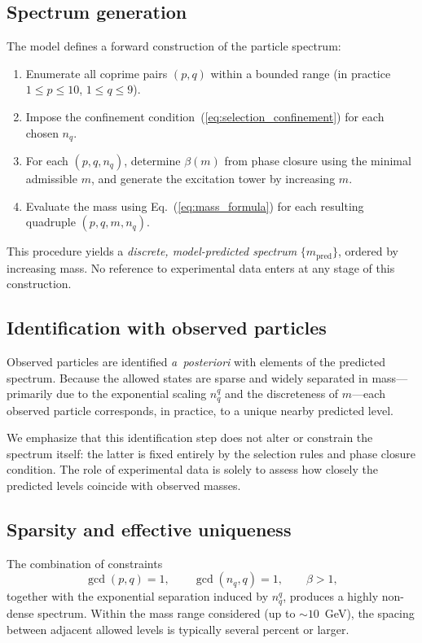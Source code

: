 \documentclass[11pt,a4paper]{article}
\begin{document}
\subsection{Spectrum generation}

The model defines a forward construction of the particle spectrum:

\begin{enumerate}
  \item Enumerate all coprime pairs $(p,q)$ within a bounded range
    (in practice $1 \le p \le 10$, $1 \le q \le 9$).
  \item Impose the confinement
    condition~(\ref{eq:selection_confinement}) for each chosen $n_q$.
  \item For each $(p,q,n_q)$, determine $\beta(m)$ from phase closure
    using the minimal admissible $m$, and generate the excitation
    tower by increasing $m$.
  \item Evaluate the mass using Eq.~(\ref{eq:mass_formula}) for each
    resulting quadruple $(p,q,m,n_q)$.
\end{enumerate}

This procedure yields a \emph{discrete, model-predicted spectrum}
$\{m_{\text{pred}}\}$, ordered by increasing mass.  No reference to
experimental data enters at any stage of this construction.

\subsection{Identification with observed particles}

Observed particles are identified \emph{a~posteriori} with elements
of the predicted spectrum.  Because the allowed states are sparse
and widely separated in mass---primarily due to the exponential
scaling $n_q^q$ and the discreteness of $m$---each observed particle
corresponds, in practice, to a unique nearby predicted level.

We emphasize that this identification step does not alter or
constrain the spectrum itself: the latter is fixed entirely by the
selection rules and phase closure condition.  The role of
experimental data is solely to assess how closely the predicted
levels coincide with observed masses.

\subsection{Sparsity and effective uniqueness}

The combination of constraints
\[
  \gcd(p,q)=1, \qquad \gcd(n_q,q)=1, \qquad \beta>1,
\]
together with the exponential separation induced by $n_q^q$,
produces a highly non-dense spectrum.  Within the mass range
considered (up to $\sim 10$~GeV), the spacing between adjacent
allowed levels is typically several percent or larger.
\end{document}

